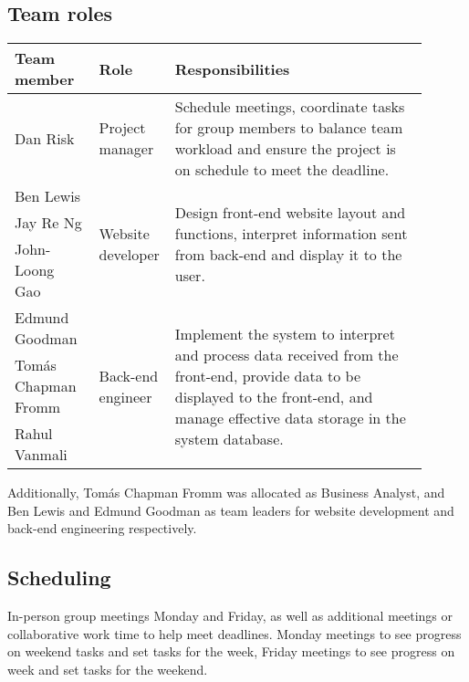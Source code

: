 \documentclass[10pt]{article}
\begin{document}
\subsection{Team roles}\vspace{-2mm}

\begin{table}[H]
\begin{tabular}{p{0.2\linewidth}|p{0.1\linewidth}|p{0.6\linewidth}}
    \hline
    \textbf{Team member} & \textbf{Role}                      & \textbf{Responsibilities} \\ \hline\hline
    Dan Risk             & Project manager                    &
        Schedule meetings, coordinate tasks for group members to balance team
        workload and ensure the project is on schedule to meet the deadline.
    \\ \hline
    Ben Lewis            & \multirow{3}{1\linewidth}{Website developer} & \multirow{3}{1\linewidth}{
        Design front-end website layout and functions, interpret information
        sent from back-end and display it to the user.
    } \\
    Jay Re Ng            & \\
    John-Loong Gao       & \\ \hline
    Edmund Goodman       & \multirow{3}{1\linewidth}{Back-end engineer} & \multirow{3}{1\linewidth}{
        Implement the system to interpret and process data received from the
        front-end, provide data to be displayed to the front-end, and manage
        effective data storage in the system database.
    } \\
    Tomás Chapman Fromm  & \\
    Rahul Vanmali        & \\
    \hline
\end{tabular}
\end{table}

Additionally, Tomás Chapman Fromm was allocated as Business Analyst, and Ben
Lewis and Edmund Goodman as team leaders for website development and back-end
engineering respectively.

\vspace{-4mm}\subsection{Scheduling}\vspace{-2mm}
In-person group meetings Monday and Friday, as well as additional meetings or
collaborative work time to help meet deadlines. Monday meetings to see progress
on weekend tasks and set tasks for the week, Friday meetings to see progress on
week and set tasks for the weekend.

\nocite{*}

\vspace{-4mm}
\end{document}
